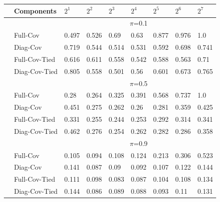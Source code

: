 \documentclass[english]{report}
\begin{document}
\begin{table}[H]
    \centering
    
    \begin{tabular}{ll|lllllll}
        \hline
                                & \textbf{Components} & $2^1$ & $2^2$ & $2^3$ & $2^4$ & $2^5$ & $2^6$ & $2^7$ \\ \hline
                                & & \multicolumn{7}{c}{$\pi$=0.1} \\ \hline
                                & Full-Cov        & 0.497 & 0.526 & 0.69 & 0.63 & 0.877 & 0.976 & 1.0   \\
                                & Diag-Cov        & 0.719 & 0.544 & 0.514 & 0.531 & 0.592 & 0.698 & 0.741  \\
                                & Full-Cov-Tied   & 0.616 & 0.611 & 0.558 & 0.542 & 0.588 & 0.563 & 0.71  \\ 
                                & Diag-Cov-Tied   & 0.805 & 0.558 & 0.501 & 0.56 & 0.601 & 0.673 & 0.765  \\ \hline

                                & & \multicolumn{7}{c}{$\pi$=0.5} \\ \hline
                                & Full-Cov          & 0.28 & 0.264 & 0.325 & 0.391 & 0.568 & 0.737 & 1.0     \\
                                & Diag-Cov          & 0.451 & 0.275 & 0.262 & 0.26 & 0.281 & 0.359 & 0.425  \\
                                & Full-Cov-Tied     & 0.331 & 0.255 & 0.244 & 0.253 & 0.292 & 0.314 & 0.341  \\ 
                                & Diag-Cov-Tied     & 0.462 & 0.276 & 0.254 & 0.262 & 0.282 & 0.286 &  0.358 \\ \hline

                                & & \multicolumn{7}{c}{$\pi$=0.9} \\ \hline
                                & Full-Cov          & 0.105 & 0.094 & 0.108 & 0.124 & 0.213 & 0.306 & 0.523    \\
                                & Diag-Cov          & 0.141 & 0.087 & 0.09 & 0.092 & 0.107 & 0.122 & 0.144  \\
                                & Full-Cov-Tied     & 0.111 & 0.098 & 0.083 & 0.087 & 0.104 & 0.108 & 0.134  \\ 
                                & Diag-Cov-Tied     & 0.144 & 0.086 & 0.089 & 0.088 & 0.093 & 0.11 & 0.131  \\ \hline 
    \hline
    \end{tabular}
\end{table}
\end{document}
